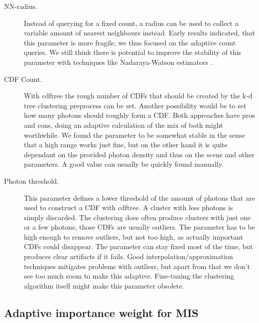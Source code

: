 \begin{description}
    \item[NN-radius.] Instead of querying for a fixed count, a radius can be used to collect a variable amount of nearest neighbours instead. Early results indicated, that this parameter is more fragile, we thus focused on the adaptive count queries. We still think there is potential to improve the stability of this parameter with techniques like Nadaraya-Watson estimators \cite{nadaraya1964estimating}.
    \item[CDF Count.] With cdftree the rough number of CDFs that should be created by the k-d tree clustering preprocess can be set. Another possibility would be to set how many photons should roughly form a CDF. Both approaches have pros and cons, doing an adaptive calculation of the mix of both might worthwhile. We found the parameter to be somewhat stable in the sense that a high range works just fine, but on the other hand it is quite dependant on the provided photon density and thus on the scene and other parameters. A good value can usually be quickly found manually.
    \item[Photon threshold.] This parameter defines a lower threshold of the amount of photons that are used to construct a CDF with cdftree. A cluster with less photons is simply discarded. The clustering does often produce clusters with just one or a few photons, those CDFs are usually outliers. The parameter has to be high enough to remove outliers, but not too high, as actually important CDFs could disappear. The parameter can stay fixed most of the time, but produces clear artifacts if it fails. Good interpolation/approximation techniques mitigates problems with outliers, but apart from that we don't see too much room to make this adaptive. Fine-tuning the clustering algorithm itself might make this parameter obsolete.
    
\end{description}

\subsection{Adaptive importance weight for MIS}
